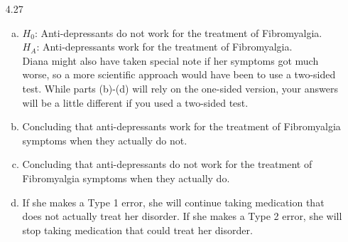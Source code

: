 \documentclass[11pt]{article}
\newenvironment{parts}{
\vspace{-0.25cm}
\begin{enumerate}[(a)]
\setlength{\itemsep}{0mm}
}
{\end{enumerate}
}
\begin{document}
\begin{enumerate}
\item[4.27]
\begin{parts}
\item $H_0$: Anti-depressants do not work for the treatment of Fibromyalgia. \\
$H_A$: Anti-depressants work for the treatment of Fibromyalgia. \\
Diana might also have taken special note if her symptoms got much worse, so a more scientific approach would have been to use a two-sided test. While parts (b)-(d) will rely on the one-sided version, your answers will be a little different if you used a two-sided test.
\item Concluding that anti-depressants work for the treatment of Fibromyalgia symptoms when they actually do not.
\item Concluding that anti-depressants do not work for the treatment of Fibromyalgia symptoms when they actually do.
\item If she makes a Type 1 error, she will continue taking medication that does not actually treat her disorder. If she makes a Type 2 error, she will stop taking medication that could treat her disorder.
\end{parts}


\end{enumerate}
\end{document}
